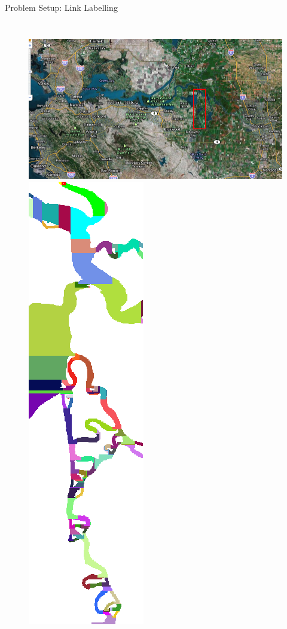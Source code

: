 \documentclass[xcolor=pdflatex,dvipsnames,table]{beamer}
\begin{document}
\begin{frame}{Problem Setup: Link Labelling}
\begin{columns}[c]
  \begin{figure}
  \includegraphics[width=1\linewidth]{figures/domain.png}\\
  \hfill
  \includegraphics[height=0.5\textheight]{figures/labelled.png}
  \end{figure}
\end{columns}
\end{frame}
\end{document}
